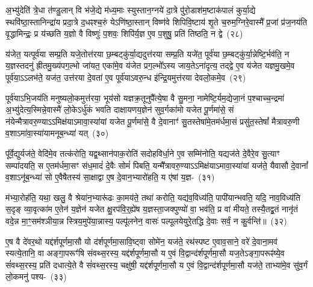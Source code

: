 अ॒भ्यु॑देति॑ त्रे॒धा त॑ण्डु॒लान् वि भ॑जे॒द्ये म॑ध्य॒माः स्युस्तान॒ग्नये॑ दा॒त्रे पु॑रो॒डाश॑म॒ष्टाक॑पालं कुर्या॒द्ये स्थवि॑ष्ठा॒स्तानिन्द्रा॑य प्रदा॒त्रे द॒धꣴश्च॒रुं ये\-ऽणि॑ष्ठा॒स्तान् विष्ण॑वे शिपिवि॒ष्टाय॑ शृ॒ते च॒रुम॒ग्निरे॒वास्मै᳚ प्र॒जां प्र॑ज॒नय॑ति वृ॒द्धामिन्द्रः॒ प्र य॑च्छति य॒ज्ञो वै विष्णुः॑ प॒शवः॒ शिपि॑र्य॒ज्ञ ए॒व प॒शुषु॒ प्रति॑ तिष्ठति॒ न द्वे~(२८)\ip

य॑जेत॒ यत्पूर्व॑या सम्प्र॒ति यजे॒तोत्त॑रया छ॒म्बट्कु॑र्या॒द्यदुत्त॑रया सम्प्र॒ति यजे॑त॒ पूर्व॑या छ॒म्बट्कु॑र्या॒न्नेष्टि॒र्भव॑ति॒ न य॒ज्ञस्तदनु॑ ह्रीतमु॒ख्य॑पग॒ल्भो जा॑यत॒ एका॑मे॒व य॑जेत प्रग॒ल्भो᳚\-ऽस्य जाय॒ते\-ऽना॑दृत्य॒ तद्द्वे ए॒व य॑जेत यज्ञमु॒खमे॒व पूर्व॑या॒\-ऽऽ\-लभ॑ते॒ यज॑त॒ उत्त॑रया दे॒वता॑ ए॒व पूर्व॑या\-ऽवरु॒न्ध इ॑न्द्रि॒यमुत्त॑रया देवलो॒कमे॒व~(२९)\ip

पूर्व॑या\-ऽभि॒जय॑ति मनुष्यलो॒कमुत्त॑रया॒ भूय॑सो यज्ञक्र॒तूनुपै᳚त्ये॒षा वै सु॒मना॒ नामेष्टि॒र्यम॒द्येजा॒नं प॒श्चाच्च॒न्द्रमा॑ अ॒भ्यु॑देत्य॒स्मिन्ने॒वास्मै॑ लो॒के\-ऽर्धु॑कं भवति दाक्षायणय॒ज्ञेन॑ सुव॒र्गका॑मो यजेत पू॒र्णमा॑से॒ सं न॑येन्मैत्रावरु॒ण्या\-ऽऽ\-\-मिक्ष॑या\-ऽमावा॒स्या॑यां यजेत पू॒र्णमा॑से॒ वै दे॒वानाꣳ॑ सु॒तस्तेषा॑मे॒तम॑र्धमा॒सं प्रसु॑त॒स्तेषां᳚ मैत्रावरु॒णी व॒शा\-ऽमा॑वा॒स्या॑यामनूब॒न्ध्या॑ यत्~(३०)\ip

पू᳚र्वे॒द्युर्यज॑ते॒ वेदि॑मे॒व तत्क॑रोति॒ यद्व॒थ्सान॑पाक॒रोति॑ सदोहविर्धा॒ने ए॒व सम्मि॑नोति॒ यद्यज॑ते दे॒वैरे॒व सु॒त्याꣳ सम्पा॑दयति॒ स ए॒तम॑र्धमा॒सꣳ स॑ध॒मादं॑ दे॒वैः सोमं॑ पिबति॒ यन्मै᳚त्रावरु॒ण्या\-ऽऽ\-\-मिक्ष॑या\-ऽमावा॒स्या॑यां यज॑ते॒ यैवासौ दे॒वानां᳚ व॒शा\-ऽनू॑ब॒न्ध्या॑ सो ए॒वैषैतस्य॑ सा॒क्षाद्वा ए॒ष दे॒वान॒भ्यारो॑हति॒ य ए॑षां य॒ज्ञ-~(३१)\ip

म॑भ्या॒रोह॑ति॒ यथा॒ खलु॒ वै श्रेया॑न॒भ्यारू॑ढः का॒मय॑ते॒ तथा॑ करोति॒ यद्य॑व॒विध्य॑ति॒ पापी॑यान्भवति॒ यदि॒ नाव॒विध्य॑ति स॒दृङ् व्या॒वृत्का॑म ए॒तेन॑ य॒ज्ञेन॑ यजेत क्षु॒रप॑वि॒र्॒\mbox{}ह्ये॑ष य॒ज्ञस्ता॒जक्पुण्यो॑ वा॒ भव॑ति॒ प्र वा॑ मीयते॒ तस्यै॒तद्व्र॒तं नानृ॑तं वदे॒न्न मा॒ꣳ॒सम॑श्ञीया॒न्न स्त्रिय॒\-मु\-पे॑या॒न्नास्य॒ पल्पू॑लनेन॒ वासः॑ पल्पूलयेयुरे॒तद्धि दे॒वाः सर्वं॒ न कु॒र्वन्ति॑॥~(३२)\ip

{\anuvakamend[{च॒न्द्रमा॒ द्वे दे॑वलो॒कमे॒व यद्य॒ज्ञं प॑ल्पूलयेयुः॒ षट्च॑}]}

ए॒ष वै दे॑वर॒थो यद्द॑र्\mbox{}श\-पूर्ण\-मा॒सौ यो द॑र्\mbox{}शपूर्णमा॒सावि॒ष्ट्वा सोमे॑न॒ यज॑ते॒ रथ॑स्पष्ट ए॒वाव॒साने॒ वरे॑ दे॒वाना॒मव॑ स्यत्ये॒तानि॒ वा अङ्गा॒परूꣳ॑षि संवथ्स॒रस्य॒ यद्द॑र्\mbox{}श\-पूर्ण\-मा॒सौ य ए॒वं वि॒द्वान्द॑र्\mbox{}शपूर्णमा॒सौ यज॒ते\-ऽङ्गा॒परूꣴ॑ष्ये॒व सं॑वथ्स॒रस्य॒ प्रति॑ दधात्ये॒ते वै सं॑वथ्स॒रस्य॒ चक्षु॑षी॒ यद्द॑र्\mbox{}श\-पूर्ण\-मा॒सौ य ए॒वं वि॒द्वान्द॑र्\mbox{}शपूर्णमा॒सौ यज॑ते॒ ताभ्या॑मे॒व सु॑व॒र्गं लो॒कमनु॑ \mbox{पश्य-~(३३)\ip}

